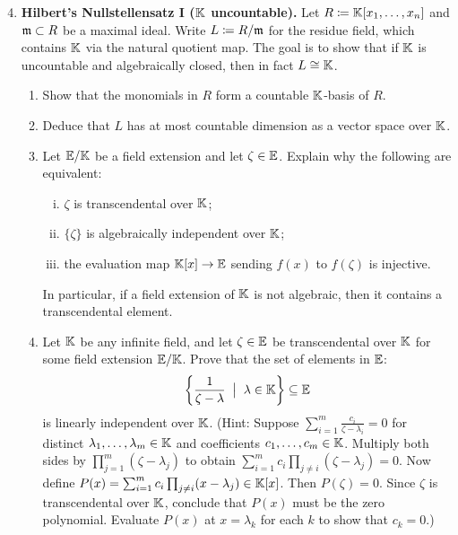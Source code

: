 \documentclass[12pt,reqno]{amsart}
\begin{document}
\begin{enumerate}[leftmargin=*]
\setcounter{enumi}{3}

\item \textbf{Hilbert's Nullstellensatz I ($\mathbb{K}$ uncountable).} Let $R \coloneqq \mathbb{K}[x_1,\ldots,x_n]$ and $\mathfrak{m} \subset R$ be a maximal ideal. Write $L\coloneqq R/\mathfrak{m}$ for the residue field, which contains $\mathbb{K}$ via the natural quotient map. The goal is to show that if $\mathbb{K}$ is uncountable and algebraically closed, then in fact $L\cong \mathbb{K}$.
\begin{enumerate}[label=(\alph*),ref=\theenumi\alph*]
\item Show that the monomials in $R$ form a countable $\mathbb{K}$-basis of $R$.
\item Deduce that $L$ has at most countable dimension as a vector space over $\mathbb{K}$.
\item Let $\mathbb{E}/\mathbb{K}$ be a field extension and let $\zeta \in \mathbb{E}$. Explain why the following are equivalent:
\begin{enumerate}[(i)]
\item $\zeta$ is transcendental over $\mathbb{K}$;
\item $\{\zeta\}$ is algebraically independent over $\mathbb{K}$;
\item the evaluation map $\mathbb{K}[x]\to \mathbb{E}$ sending $f(x)$ to $f(\zeta)$ is injective.
\end{enumerate}
In particular, if a field extension of $\mathbb{K}$ is not algebraic, then it contains a transcendental element.
\item\label{ex-part:family} Let $\mathbb{K}$ be any infinite field, and let $\zeta \in \mathbb{E}$ be transcendental over $\mathbb{K}$ for some field extension $\mathbb{E}/\mathbb{K}$. Prove that the set of elements in $\mathbb{E}$:
\[
\left\{\frac{1}{\zeta-\lambda} \;\; \big| \;\; \lambda \in \mathbb{K} \right\} \subseteq \mathbb{E}
\]
is linearly independent over $\mathbb{K}$. (Hint: Suppose $\sum_{i=1}^m \frac{c_i}{\zeta-\lambda_i}=0$ for distinct $\lambda_1,\dots,\lambda_m\in \mathbb{K}$ and coefficients $c_1,\dots,c_m\in \mathbb{K}$. Multiply both sides by $\prod_{j=1}^m (\zeta-\lambda_j)$ to obtain $\sum_{i=1}^m c_i \prod_{j\neq i} (\zeta-\lambda_j)=0$. Now define $P(x)=\sum_{i=1}^m c_i \prod_{j\neq i} (x-\lambda_j)\in \mathbb{K}[x]$. Then $P(\zeta)=0$. Since $\zeta$ is transcendental over $\mathbb{K}$, conclude that $P(x)$ must be the zero polynomial. Evaluate $P(x)$ at $x=\lambda_k$ for each $k$ to show that $c_k=0$.)


\end{enumerate}
\end{enumerate}
\end{document}
